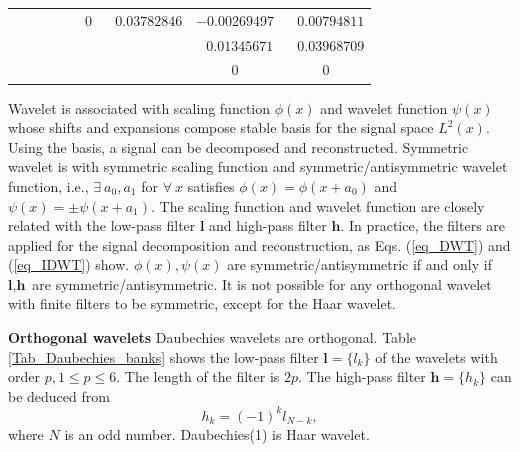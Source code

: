 \begin{table}
\begin{center}
{\begin{tabular}{c|cc|cc|cc|cc}
			&              &                      &              &                      &       $0$       &   $~~~0.03782846$    &  $-0.00269497$  &   $~~~0.00794811$    \\
			&              &                      &              &                      &                 &                      & $~~~0.01345671$ &   $~~~0.03968709$    \\
			&              &                      &              &                      &                 &                      &       $0$       &         $0$          \\ \hline
	\end{tabular}}
\end{center}
\end{table}
Wavelet is associated with scaling function $\phi(x)$ and wavelet function $\psi(x)$
whose shifts and expansions compose stable basis for the signal space $L^2(x)$.
Using the basis, a signal can be decomposed and reconstructed.
Symmetric wavelet is with symmetric scaling function and symmetric/antisymmetric wavelet function,
i.e., $\exists~a_0, a_1$ for $\forall~x$ satisfies $\phi(x) = \phi(x+a_0)$ and $\psi(x) = \pm\psi(x+a_1)$.
The scaling function and wavelet function are closely related with the low-pass filter $\textbf{l}$ and high-pass filter $\textbf{h}$.
In practice, the filters are applied for the signal decomposition and reconstruction, as Eqs. (\ref{eq_DWT}) and (\ref{eq_IDWT}) show.
$\phi(x), \psi(x)$ are symmetric/antisymmetric if and only if $\textbf{l}, \textbf{h}$ are symmetric/antisymmetric.
It is not possible for any orthogonal wavelet with finite filters to be symmetric, except for the Haar wavelet.

\textbf{Orthogonal wavelets}\label{APP_ortho_wavelet}\quad
Daubechies wavelets are orthogonal.
Table \ref{Tab_Daubechies_banks} shows the low-pass filter $\textbf{l} = \{l_k\}$ of the wavelets with order $p, 1\leq p\leq6$.
The length of the filter is $2p$.
The high-pass filter $\textbf{h} = \{h_k\}$ can be deduced from
\begin{equation}\label{eq_high_pass_bank}
h_k = (-1)^k l_{N-k},
\end{equation}
where $N$ is an odd number.
Daubechies(1) is Haar wavelet.

